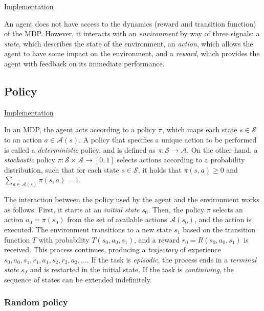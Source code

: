 \documentclass{article}
\begin{document}
\noindent
\href{https://github.com/davidrobles/mlnd-capstone-code/blob/master/capstone/environment/environment.py}
     {Implementation}
\break

An agent does not have access to the dynamics (reward and transition function) of the MDP. However,
it interacts with an \emph{environment} by way of three signals: a \emph{state}, which describes the
state of the environment, an \emph{action}, which allows the agent to have some impact on the
environment, and a \emph{reward}, which provides the agent with feedback on its immediate
performance.

\subsection{Policy}

\noindent
\href{https://github.com/davidrobles/mlnd-capstone-code/blob/master/capstone/policy/policy.py}
     {Implementation}
\break

In an MDP, the agent acts according to a policy $\pi$, which maps each state $s \in \mathcal{S}$ to
an action $a \in \mathcal{A}(s)$. A policy that specifies a unique action to be performed is called
a \emph{deterministic} policy, and is defined as $\pi : \mathcal{S} \rightarrow \mathcal{A}$. On the
other hand, a \emph{stochastic} policy $\pi : \mathcal{S} \times \mathcal{A} \rightarrow [0,1]$
selects actions according to a probability distribution, such that for each state $s \in
\mathcal{S}$, it holds that $\pi(s,a) \geq 0$ and $\sum_{a\in\mathcal{A}(s)} \pi(s,a) = 1$.

The interaction between the policy used by the agent and the environment works as follows. First, it
starts at an \emph{initial state} $s_0$. Then, the policy $\pi$ selects an action $a_0 = \pi(s_0)$
from the set of available actions $\mathcal{A}(s_0)$, and the action is executed. The environment
transitions to a new state $s_1$ based on the transition function $T$ with probability
$T(s_0,a_0,s_1)$, and a reward $r_0 = R(s_0, a_0, s_1)$ is received. This process continues,
producing a \emph{trajectory} of experience $s_0, a_0, s_1, r_1, a_1, s_2, r_2, a_2, \dots$. If the
task is \emph{episodic}, the process ends in a \emph{terminal state} $s_T$ and is restarted in the
initial state. If the task is \emph{continiuing}, the sequence of states can be extended
indefinitely.

\subsubsection{Random policy}
\end{document}

